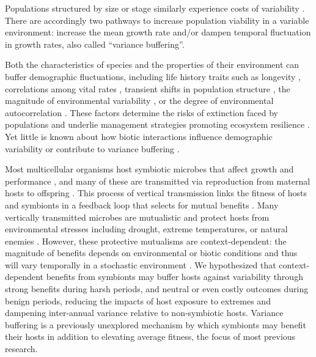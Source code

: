 \documentclass[12pt]{article}
\begin{document}
\noindent Populations structured by size or stage similarly experience costs of variability \cite{cohen1979comparative,tuljapurkar2013population}.
There are accordingly two pathways to increase population viability in a variable environment: increase the mean growth rate and/or dampen temporal fluctuation in growth rates, also called ``variance buffering''.

Both the characteristics of species and the properties of their environment can buffer demographic fluctuations, including life history traits such as longevity \cite{pfister1998patterns, morris2008longevity}, correlations among vital rates \cite{compagnoni2016effect}, transient shifts in population structure \cite{ellis2013role}, the magnitude of environmental variability \cite{rodriguez2021limits}, or the degree of environmental autocorrelation \cite{tuljapurkar1980population,fieberg2001stochastic}. 
These factors determine the risks of extinction faced by populations \cite{menges2000applications} and underlie management strategies promoting ecosystem resilience \cite{kuparinen2016fishing}. 
Yet little is known about how biotic interactions influence demographic variability or contribute to variance buffering \cite{hilde_demographic_2020}. 

Most multicellular organisms host symbiotic microbes that affect growth and performance \cite{rodriguez2009fungal,mcfall2013animals}, and many of these are transmitted via reproduction from maternal hosts to offspring \cite{funkhouser2013mom}.
This process of vertical transmission links the fitness of hosts and symbionts in a feedback loop that selects for mutual benefits \cite{ewald1987transmission,fine1975vectors}.
Many vertically transmitted microbes are mutualistic and protect hosts from environmental stresses including drought, extreme temperatures, or natural enemies \cite{russell2006costs,brownlie2009symbiont,kivlin2013fungal,corbin2017heritable,hoadley2019host}. 
However, these protective mutualisms are context-dependent: the magnitude of benefits depends on environmental or biotic conditions \cite{chamberlain2014context} and thus will vary temporally in a stochastic environment \cite{jordano1994spatial,billick2003relative}.
We hypothesized that context-dependent benefits from symbionts may buffer hosts against variability through strong benefits during harsh periods, and neutral or even costly outcomes during benign periods, reducing the impacts of host exposure to extremes and dampening inter-annual variance relative to non-symbiotic hosts.
Variance buffering is a previously unexplored mechanism by which symbionts may benefit their hosts in addition to elevating average fitness, the focus of most previous research. 
\end{document}
